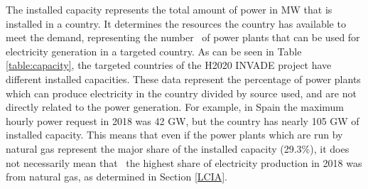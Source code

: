 The installed capacity represents the total amount of power in MW that is installed in a country. It determines the  resources the country has available to meet the demand, representing the {number}%
~of power plants that can be used for electricity generation in a targeted country. 
As can be seen in  Table \ref{table:capacity}, the targeted countries of the H2020 INVADE project have different  installed capacities. These data represent the percentage of power plants which can produce electricity in the country divided by source used, and are not directly related to the power generation. For example, in Spain the maximum hourly power request in 2018 was 42 GW, but the country has nearly 105 GW of installed capacity. This means that even if the power plants which are run by natural gas represent the major share of the installed capacity (29.3\%), it does not necessarily{ mean that}%
~the highest share of electricity production in 2018 was from natural gas, as determined in Section \ref{LCIA}.

